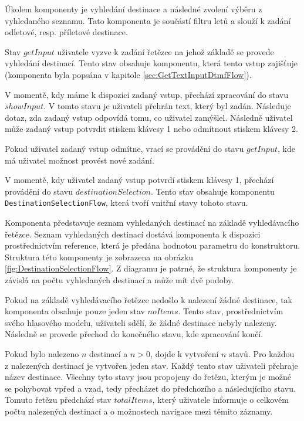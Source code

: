 \documentclass[ing,male,java,dept460,twoside]{diploma}						%
\begin{document}
Úkolem komponenty je vyhledání destinace a následné zvolení výběru z vyhledaného seznamu. Tato komponenta je součástí filtru letů a slouží k zadání odletové, resp. příletové destinace.

Stav $getInput$ uživatele vyzve k zadání řetězce na jehož základě se provede vyhledání destinací. Tento stav obsahuje komponentu, která tento vstup zajišťuje (komponenta byla popsána v kapitole \ref{sec:GetTextInputDtmfFlow}).

V momentě, kdy máme k dispozici zadaný vstup, přechází zpracování do stavu $showInput$. V tomto stavu je uživateli přehrán text, který byl zadán. Následuje dotaz, zda zadaný vstup odpovídá tomu, co uživatel zamýšlel. Následně uživatel může zadaný vstup potvrdit stiskem klávesy 1 nebo odmítnout stiskem klávesy 2.

Pokud uživatel zadaný vstup odmítne, vrací se provádění do stavu $getInput$, kde má uživatel možnost provést nové zadání.

V momentě, kdy uživatel zadaný vstup potvrdí stiskem klávesy 1, přechází provádění do stavu $destinationSelection$. Tento stav obsahuje komponentu \texttt{DestinationSelectionFlow}, která tvoří vnitřní stavy tohoto stavu.

Komponenta představuje seznam vyhledaných destinací na základě vyhledávacího řetězce. Seznam vyhledaných destinací dostává komponenta k dispozici prostřednictvím reference, která je předána hodnotou parametru do konstruktoru. Struktura této komponenty je zobrazena na obrázku \ref{fig:DestinationSelectionFlow}. Z diagramu je patrné, že struktura komponenty je závislá na počtu vyhledaných destinací a může mít dvě podoby.

Pokud na základě vyhledávacího řetězce nedošlo k nalezení žádné destinace, tak komponenta obsahuje pouze jeden stav $noItems$. Tento stav, prostřednictvím svého hlasového modelu, uživateli sdělí, že žádné destinace nebyly nalezeny. Následně se provede přechod do konečného stavu, kde zpracování končí.

Pokud bylo nalezeno $n$ destinací a $n > 0$, dojde k vytvoření $n$ stavů. Pro každou z nalezených destinací je vytvořen jeden stav. Každý tento stav uživateli přehraje název destinace. Všechny tyto stavy jsou propojeny do řetězu, kterým je možné se pohybovat vpřed a vzad, tedy přecházet do předchozího a následujícího stavu. Tomuto řetězu předchází stav $totalItems$, který uživatele informuje o celkovém počtu nalezených destinací a o možnostech navigace mezi těmito záznamy.
\end{document}
